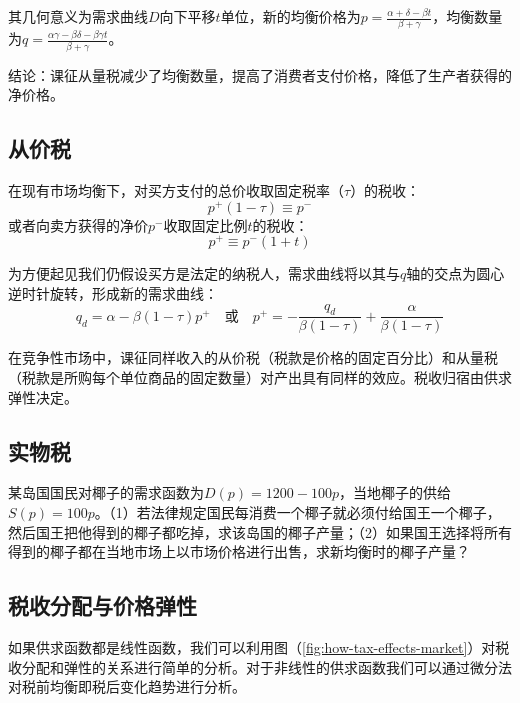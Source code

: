 其几何意义为需求曲线$D$向下平移$t$单位，新的均衡价格为$p = \frac{{\alpha  + \delta  - \beta t}}{{\beta  + \gamma }}$，均衡数量为$q = \frac{{\alpha \gamma  - \beta \delta  - \beta \gamma t}}{{\beta  + \gamma }}$。

结论：课征从量税减少了均衡数量，提高了消费者支付价格，降低了生产者获得的净价格。

\subsection{从价税}
\label{sec:ad-valorem tax-Tax}

在现有市场均衡下，对买方支付的总价收取固定税率（$\tau$）的税收：
\begin{equation}
p^{+}(1-\tau) \equiv p^{-}
\end{equation}
或者向卖方获得的净价$p^{-}$收取固定比例$t$的税收：
\begin{equation}
p^{+} \equiv p^{-}(1+t)
\end{equation}

为方便起见我们仍假设买方是法定的纳税人，需求曲线将以其与$q$轴的交点为圆心逆时针旋转，形成新的需求曲线：
\begin{equation}
{q_d} = \alpha  - \beta (1 - \tau )p^{+} \quad \text{或} \quad p^{+} =  - \frac{{{q_d}}}{{\beta (1 - \tau )}} + \frac{\alpha }{{\beta (1 - \tau )}}
\end{equation}

在竞争性市场中，课征同样收入的从价税（税款是价格的固定百分比）和从量税（税款是所购每个单位商品的固定数量）对产出具有同样的效应。税收归宿由供求弹性决定。


\subsection{实物税}

某岛国国民对椰子的需求函数为$D(p)=1200-100p$，当地椰子的供给$S(p)=100p$。（1）若法律规定国民每消费一个椰子就必须付给国王一个椰子，然后国王把他得到的椰子都吃掉，求该岛国的椰子产量；（2）如果国王选择将所有得到的椰子都在当地市场上以市场价格进行出售，求新均衡时的椰子产量？

\subsection{税收分配与价格弹性}
\label{subsec:tax-incidence-and-price-elasticities}

如果供求函数都是线性函数，我们可以利用图（\ref{fig:how-tax-effects-market}）对税收分配和弹性的关系进行简单的分析。对于非线性的供求函数我们可以通过微分法对税前均衡即税后变化趋势进行分析。

